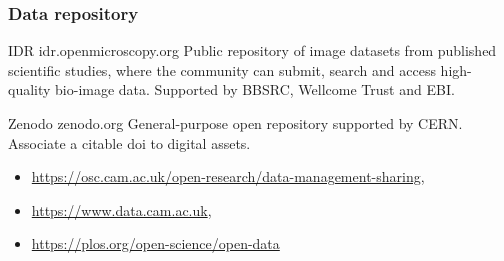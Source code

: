 \documentclass[ignorenonframetext,aspectratio=169,10pt,xcolor=table]{beamer}
\begin{document}
\begin{frame} \frametitle{Data repository}

  \begin{block}{IDR idr.openmicroscopy.org}
    Public repository of image datasets from published scientific studies, where
    the community can submit, search and access high-quality bio-image data.
    Supported by BBSRC, Wellcome Trust and EBI.
  \end{block}

  \begin{block}{Zenodo zenodo.org}
    General-purpose open repository supported by CERN. Associate a citable doi
    to digital assets.
  \end{block}



  \begin{itemize}
  \item \url{https://osc.cam.ac.uk/open-research/data-management-sharing},
  \item \url{https://www.data.cam.ac.uk},
  \item \url{https://plos.org/open-science/open-data}
  \end{itemize}


\end{frame}




\end{document}
